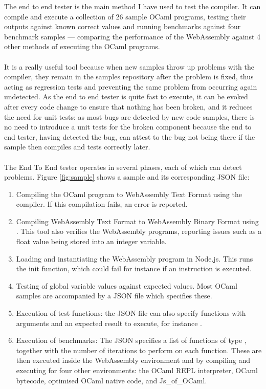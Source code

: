 The end to end tester is the main method I have used to test the compiler. It can compile and execute a collection of 26 sample OCaml programs, testing their outputs against known correct values and running benchmarks against four benchmark samples --- comparing the performance of the WebAssembly against 4 other methods of executing the OCaml programs.
\\\\
It is a really useful tool because when new samples throw up problems with the compiler, they remain in the samples repository after the problem is fixed, thus acting as regression tests and preventing the same problem from occurring again undetected. As the end to end tester is quite fast to execute, it can be evoked after every code change to ensure that nothing has been broken, and it reduces the need for unit tests: as most bugs are detected by new code samples, there is no need to introduce a unit tests for the broken component because the end to end tester, having detected the bug, can attest to the bug not being there if the sample then compiles and tests correctly later.
\\\\
The End To End tester operates in several phases, each of which can detect problems. Figure \ref{fig:sample} shows a sample and its corresponding JSON file:
\begin{enumerate}
	\item Compiling the OCaml program to WebAssembly Text Format using the compiler. If this compilation fails, an error is reported.
	\item Compiling WebAssembly Text Format to WebAssembly Binary Format using . This tool also verifies the WebAssembly programs, reporting issues such as a float value being stored into an integer variable.
	\item Loading and instantiating the WebAssembly program in Node.js. This runs the init function, which could fail for instance if an  instruction is executed.
	\item Testing of global variable values against expected values. Most OCaml samples are accompanied by a JSON file which specifies these.
	\item Execution of test functions: the JSON file can also specify functions with arguments and an expected result to execute, for instance .
	\item Execution of benchmarks: The JSON specifies a list of functions of type , together with the number of iterations to perform on each function. These are then executed inside the WebAssembly environment and by compiling and executing for four other environments: the OCaml REPL interpreter, OCaml bytecode, optimised OCaml native code, and Js\_of\_OCaml.
\end{enumerate}
